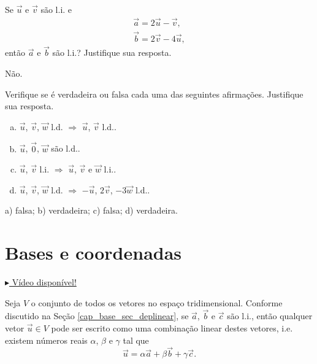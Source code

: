 \begin{exer}
  Se $\vec{u}$ e $\vec{v}$ são l.i. e
  \begin{align}
    \vec{a} = 2\vec{u} - \vec{v},\\
    \vec{b} = 2\vec{v} - 4\vec{u},
  \end{align}
  então $\vec{a}$ e $\vec{b}$ são l.i.? Justifique sua resposta.
\end{exer}
\begin{resp}
  Não.
\end{resp}

\begin{exer}
  Verifique se é verdadeira ou falsa cada uma das seguintes afirmações. Justifique sua resposta.
  \begin{enumerate}[a)]
  \item $\vec{u}$, $\vec{v}$, $\vec{w}$ l.d. $\Rightarrow$ $\vec{u}$, $\vec{v}$ l.d..
  \item $\vec{u}$, $\vec{0}$, $\vec{w}$ são l.d..
  \item $\vec{u}$, $\vec{v}$ l.i. $\Rightarrow$ $\vec{u}$, $\vec{v}$ e $\vec{w}$ l.i..
  \item $\vec{u}$, $\vec{v}$, $\vec{w}$ l.d. $\Rightarrow$ $-\vec{u}$, $2\vec{v}$, $-3\vec{w}$ l.d..
  \end{enumerate}
\end{exer}
\begin{resp}
  a) falsa; b) verdadeira; c) falsa; d) verdadeira.
\end{resp}

\section{Bases e coordenadas}\label{cap_base_sec_base}
\badgeRevisar

\begin{flushright}
  \href{https://archive.org/details/bases-e-coordenadas}{$\blacktriangleright$ Vídeo disponível!}
\end{flushright}

Seja $V$ o conjunto de todos os vetores no espaço tridimensional. Conforme discutido na Seção \ref{cap_base_sec_deplinear}, se $\vec{a}$, $\vec{b}$ e $\vec{c}$ são l.i., então qualquer vetor $\vec{u}\in V$ pode ser escrito como uma combinação linear destes vetores, i.e. existem números reais $\alpha$, $\beta$ e $\gamma$ tal que
\begin{equation}
  \vec{u} = \alpha\vec{a} + \beta\vec{b} + \gamma\vec{c}.
\end{equation}

